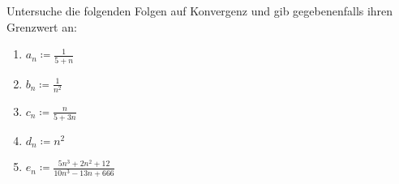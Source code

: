 \begin{exercise}
  Untersuche die folgenden Folgen auf Konvergenz und gib gegebenenfalls ihren
  Grenzwert an:
  \begin{enumerate}
  \item $\displaystyle a_n \coloneqq \frac{1}{5 + n}$
  \item $\displaystyle b_n \coloneqq \frac{1}{n^2}$
  \item $\displaystyle c_n \coloneqq \frac{n}{5 + 3n}$
  \item $\displaystyle d_n \coloneqq n^2$
  \item $\displaystyle e_n \coloneqq \frac{5n^3 + 2n^2 + 12}{10n^3 - 13n + 666}$
  \end{enumerate}
\end{exercise}
